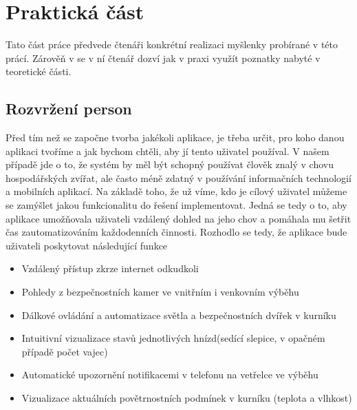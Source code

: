 ﻿


\chapter{Praktická část}
Tato část práce předvede čtenáři konkrétní realizaci myšlenky probírané v této prácí.
Zárověň v se v ní čtenář dozví jak v praxi využít poznatky nabyté v teoretické části.


\section{Rozvržení person}
Před tím než se započne tvorba jakékoli aplikace, je třeba určit, pro koho danou aplikaci tvoříme a jak bychom chtěli, aby jí tento uživatel používal.
V našem případě jde o to, že systém by měl být schopný používat člověk znalý v chovu hospodářských zvířat, ale často méně zdatný v používání informačních technologií a mobilních aplikací.
Na základě toho, že už víme, kdo je cílový uživatel můžeme se zamýšlet jakou funkcionalitu do řešení implementovat.
Jedná se tedy o to, aby aplikace umožňovala uživateli vzdálený dohled na jeho chov a pomáhala mu šetřit čas zautomatizováním každodenních činnosti.
Rozhodlo se tedy, že aplikace bude uživateli poskytovat následující funkce
\begin{itemize}
    \item Vzdálený přístup zkrze internet odkudkoli
    \item Pohledy z bezpečnostních kamer ve vnitřním i venkovním výběhu
    \item Dálkové ovládání a automatizace světla a bezpečnostních dvířek v kurníku
    \item Intuitivní vizualizace stavů jednotlivých hnízd(sedící slepice, v opačném případě počet vajec)
    \item Automatické upozornění notifikacemi v telefonu na vetřelce ve výběhu
    \item Vizualizace aktuálních povětrnostních podmínek v kurníku (teplota a vlhkost)
\end{itemize}


